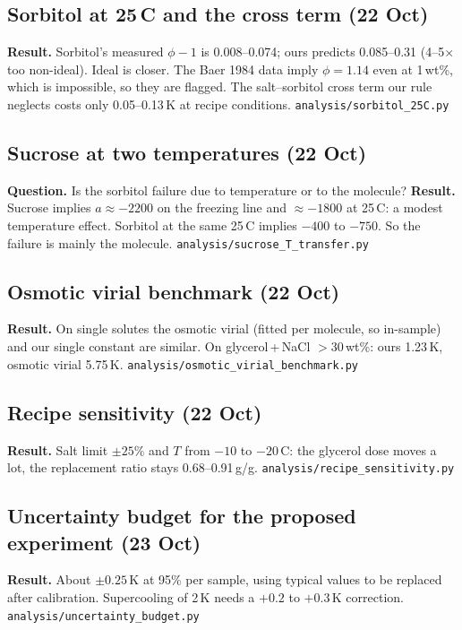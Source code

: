 \documentclass[11pt,a4paper]{article}
\newcommand{\file}[1]{\texttt{\small #1}}
\begin{document}
\subsection{Sorbitol at 25\,\textdegree C and the cross term (22 Oct)}
\textbf{Result.} Sorbitol's measured $\phi-1$ is 0.008--0.074; ours predicts 0.085--0.31 (4--5$\times$ too
non-ideal). Ideal is closer. The Baer 1984 data imply $\phi=1.14$ even at 1\,wt\%, which is impossible, so they are
flagged. The salt--sorbitol cross term our rule neglects costs only 0.05--0.13\,K at recipe conditions.
\file{analysis/sorbitol\_25C.py}

\subsection{Sucrose at two temperatures (22 Oct)}
\textbf{Question.} Is the sorbitol failure due to temperature or to the molecule?
\textbf{Result.} Sucrose implies $a\approx-2200$ on the freezing line and $\approx-1800$ at 25\,\textdegree C: a modest
temperature effect. Sorbitol at the same 25\,\textdegree C implies $-400$ to $-750$. So the failure is mainly the
molecule. \file{analysis/sucrose\_T\_transfer.py}

\subsection{Osmotic virial benchmark (22 Oct)}
\textbf{Result.} On single solutes the osmotic virial (fitted per molecule, so in-sample) and our single constant
are similar. On glycerol\,+\,NaCl $>30$\,wt\%: ours 1.23\,K, osmotic virial 5.75\,K. \file{analysis/osmotic\_virial\_benchmark.py}

\subsection{Recipe sensitivity (22 Oct)}
\textbf{Result.} Salt limit $\pm25\%$ and $T$ from $-10$ to $-20$\,\textdegree C: the glycerol dose moves a lot, the
replacement ratio stays 0.68--0.91\,g/g. \file{analysis/recipe\_sensitivity.py}

\subsection{Uncertainty budget for the proposed experiment (23 Oct)}
\textbf{Result.} About $\pm0.25$\,K at 95\% per sample, using typical values to be replaced after calibration.
Supercooling of 2\,K needs a $+0.2$ to $+0.3$\,K correction. \file{analysis/uncertainty\_budget.py}
\end{document}
